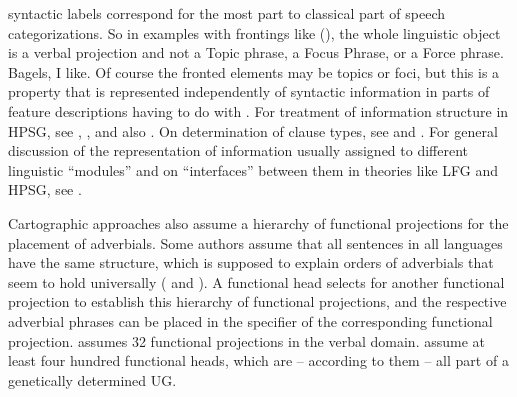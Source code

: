 \documentclass[output=paper
 	        ,biblatex
                ,babelshorthands
                ,newtxmath
                ,draftmode
                ,colorlinks, citecolor=brown
]{langscibook}
\begin{document}
syntactic labels correspond for the most part to classical part of speech categorizations. So in examples with
frontings like (), the whole linguistic object is a verbal projection and not a Topic phrase, a Focus
Phrase, or a Force phrase.
\ea
Bagels, I like.
\z
Of course the fronted elements may be topics or foci, but this is a property that is represented
independently of syntactic information in parts of feature descriptions having to do with
. For treatment of information structure in HPSG, see
, ,  and also
. On determination of clause types, see 
and . For general discussion of the representation of
information usually assigned to different linguistic ``modules'' and on ``interfaces''
between them in theories like LFG and HPSG, see .

Cartographic approaches also assume a hierarchy of functional projections for the placement of
adverbials. Some authors assume that all sentences in all languages have the same structure, which is supposed
to explain orders of adverbials that seem to hold universally (\eg \citealp[]{Cinque99a-u}
and \citealp[--55]{CR2010a}). A functional head selects for another functional
projection to establish this hierarchy of functional projections, and the respective adverbial
phrases can be placed in the specifier of the corresponding functional projection. \citet[]{Cinque99a-u} assumes 32 functional projections in the verbal domain. \citet[, 65]{CR2010a} assume at least four hundred functional heads, which are -- according to them -- all
part of a genetically determined UG.
\end{document}
